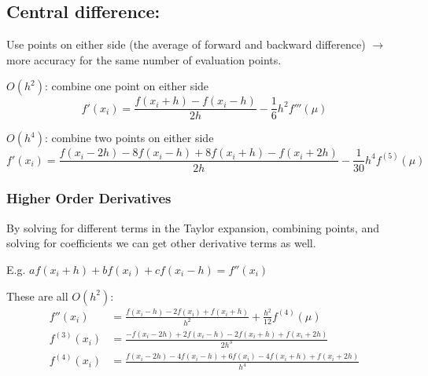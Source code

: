 \documentclass[12pt]{article}
\begin{document}
\subsection*{Central difference:}
Use points on either side (the average of forward and backward difference) $\rightarrow$ more accuracy for the same number of evaluation  points.

\underline{$O(h^2)$}: combine one point on either side
\[f'(x_i) = \frac{f(x_i + h) - f(x_i - h)}{2h} - \frac{1}{6}h^2 f'''(\mu)\]

\underline{$O(h^4)$}: combine two points on either side
\[f'(x_i) = \frac{f(x_i - 2h) - 8f(x_i - h) + 8f(x_i + h) - f(x_i + 2h)}{2h} - \frac{1}{30}h^4 f^{(5)}(\mu)\]

\subsubsection*{Higher Order Derivatives}
By solving for different terms in the Taylor expansion, combining points, and solving for coefficients we can get other derivative terms as well. 

E.g. $a f(x_i + h) + b f(x_i) + c f(x_i - h) = f''(x_i)$

These are all $O(h^2)$:
\begin{align*}
f''(x_i) &= \frac{f(x_i - h) - 2f(x_i) + f(x_i + h)}{h^2} + \frac{h^2}{12}f^{(4)}(\mu) \\
%
f^{(3)}(x_i) &= \frac{-f(x_i - 2h) + 2f(x_i - h) - 2f(x_i + h) + f(x_i + 2h)}{2h^3}\\
%
f^{(4)}(x_i) &= \frac{f(x_i - 2h) - 4f(x_i - h) +6f(x_i) - 4f(x_i + h) + f(x_i + 2h)}{h^4}
\end{align*}
\end{document}
